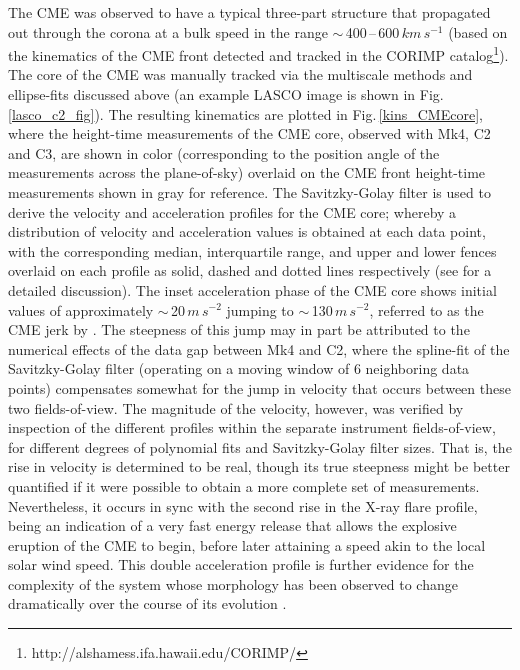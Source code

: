 \documentclass[namedreferences]{solarphysics}
\begin{document}
\begin{article}
The CME was observed to have a typical three-part structure that propagated out through the corona at a bulk speed in the range $\sim$\,400\,--\,600$\,km\,s^{-1}$ (based on the kinematics of the CME front detected and tracked in the CORIMP catalog\footnote{http://alshamess.ifa.hawaii.edu/CORIMP/}). The core of the CME was manually tracked via the multiscale methods and ellipse-fits discussed above (an example LASCO image is shown in Fig.\,\ref{lasco_c2_fig}). The resulting kinematics are plotted in Fig.\,\ref{kins_CMEcore}, where the height-time measurements of the CME core, observed with Mk4, C2 and C3, are shown in color (corresponding to the position angle of the measurements across the plane-of-sky) overlaid on the CME front height-time measurements shown in gray for reference. The Savitzky-Golay filter is used to derive the velocity and acceleration profiles for the CME core; whereby a distribution of velocity and acceleration values is obtained at each data point, with the corresponding median, interquartile range, and upper and lower fences overlaid on each profile as solid, dashed and dotted lines respectively (see  for a detailed discussion). The inset acceleration phase of the CME core shows initial values of approximately $\sim$\,20$\,m\,s^{-2}$ jumping to $\sim$\,130$\,m\,s^{-2}$, referred to as the CME jerk by . The steepness of this jump may in part be attributed to the numerical effects of the data gap between Mk4 and C2, where the spline-fit of the Savitzky-Golay filter (operating on a moving window of 6 neighboring data points) compensates somewhat for the jump in velocity that occurs between these two fields-of-view. The magnitude of the velocity, however, was verified by inspection of the different profiles within the separate instrument fields-of-view, for different degrees of polynomial fits and Savitzky-Golay filter sizes. That is, the rise in velocity is determined to be real, though its true steepness might be better quantified if it were possible to obtain a more complete set of measurements. Nevertheless, it occurs in sync with the second rise in the X-ray flare profile, being an indication of a very fast energy release that allows the explosive eruption of the CME to begin, before later attaining a speed akin to the local solar wind speed. This double acceleration profile is further evidence for the complexity of the system whose morphology has been observed to change dramatically over the course of its evolution \cite{2013ApJS..206...19M, 2012ApJ...746L...5S}.




\end{article}
\end{document}
